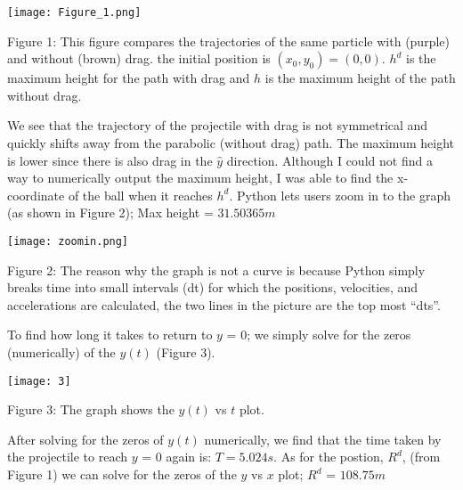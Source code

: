 \documentclass[11pt]{article}
\begin{document}
\begin{enumerate}
\begin{center}
\texttt{[image: Figure\_1.png]}
\end{center}

\begin{center}
  \begin{changemargin}{3cm}{3cm}  
Figure 1: This figure compares the trajectories of the same particle with (purple) and without (brown) drag. the initial position is $(x_0, y_0) = (0, 0)$. $h^d$ is the maximum height for the path with drag and $h$ is the maximum height of the path without drag.
  \end{changemargin}
\end{center}

We see that the trajectory of the projectile with drag is not symmetrical and quickly shifts away from the parabolic (without drag) path. The maximum height is lower since there is also drag in the $\hat{y}$ direction.
Although I could not find a way to numerically output the maximum height, I was able to find the x-coordinate of the ball when it reaches $h^d$. Python lets users zoom in to the graph (as shown in Figure 2); Max height = $31.50365m$
\begin{center}
\texttt{[image: zoomin.png]}
\end{center}
\begin{changemargin}{3cm}{3cm}  
  \begin{center}
  Figure 2: The reason why the graph is not a curve is because Python simply breaks time into small intervals (dt) for which the positions, velocities, and accelerations are calculated, the two lines in the picture are the top most ``dts''.
  \end{center}
\end{changemargin}

To find how long it takes to return to $y$ = 0; we simply solve for the zeros (numerically) of the $y(t)$ (Figure 3).
\begin{center}
\texttt{[image: 3]}
\end{center}
\begin{center}
  Figure 3: The graph shows the $y(t)$ vs $t$ plot.
\end{center}
After solving for the zeros of $y(t)$ numerically, we find that the time taken by the projectile to reach $y$ = 0 again is: $T = 5.024s$. As for the postion, $R^d$, (from Figure 1) we can solve for the zeros of the $y$ vs $x$ plot; $R^d$ = $108.75m$


\end{enumerate}
\end{document}
